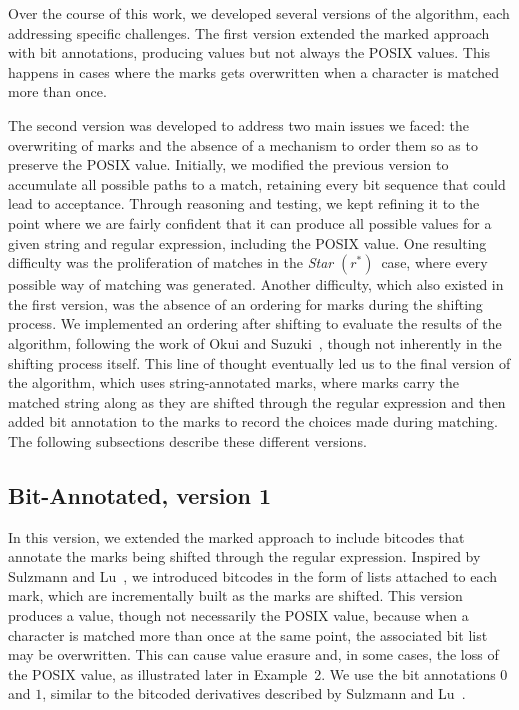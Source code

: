 \documentclass[12pt]{article}
\newcommand{\STARText}{\textit{Star} $(r^*)$}
\begin{document}
Over the course of this work, we developed several versions of the algorithm, each addressing specific challenges.  
The first version extended the marked approach with bit annotations, producing values but not always the POSIX values. 
This happens in cases where the marks gets overwritten when a character is matched more than once.

The second version was developed to address two main issues we faced: the overwriting of marks and the absence of a mechanism to order them 
so as to preserve the POSIX value. Initially, we modified the previous version to accumulate all possible paths to a match, retaining 
every bit sequence that could lead to acceptance. Through reasoning and testing, we kept refining it to the point where we are fairly confident 
that it can produce all possible values for a given string and regular expression, including the POSIX value.  
One resulting difficulty was the proliferation of matches in the \STARText\ case, where every possible way of matching was generated.  
Another difficulty, which also existed in the first version, was the absence of an ordering for marks during the shifting process.  
We implemented an ordering after shifting to evaluate the results of the algorithm, following the work of Okui and Suzuki~\cite{OkuiSuzuki2013}, 
though not inherently in the shifting process itself. This line of thought eventually led us to the final version of the algorithm, which uses 
string-annotated marks, where marks carry the matched string along as they are shifted through the regular expression and then added bit annotation to the marks
to record the choices made during matching.
The following subsections describe these different versions.

\FloatBarrier
\subsection{Bit-Annotated, version 1}

In this version, we extended the marked approach to include bitcodes that annotate the marks being 
shifted through the regular expression. Inspired by Sulzmann and Lu~\cite{Sulzmann2014}, we introduced bitcodes in the form 
of lists attached to each mark, which are incrementally built as the marks are shifted.  
This version produces a value, though not necessarily the POSIX value, because when a character is matched 
more than once at the same point, the associated bit list may be overwritten.  
This can cause value erasure and, in some cases, the loss of the POSIX value, as illustrated later in Example~2.  
We use the bit annotations $0$ and $1$, similar to the bitcoded derivatives described by Sulzmann and Lu~\cite{Sulzmann2014}.  
\end{document}
